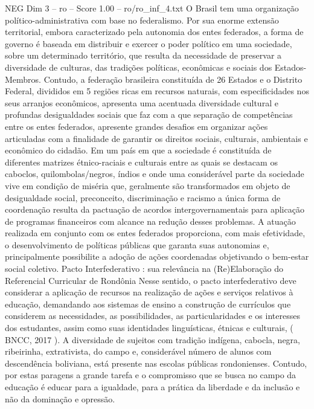 \begin{textsample}{NEG Dim 3 – ro – Score 1.00 – ro/ro\_inf\_4.txt}  \label{ex:f3_neg_152}
O Brasil tem uma organização político-administrativa com base no federalismo.
Por sua enorme extensão territorial, embora caracterizado pela autonomia dos entes federados, a forma de governo é baseada em distribuir e exercer o poder político em uma sociedade, sobre um determinado território, que resulta da necessidade de preservar a diversidade de culturas, das tradições políticas, econômicas e sociais dos Estados-Membros.
Contudo, a federação brasileira constituída de 26 Estados e o Distrito Federal, divididos em 5 regiões ricas em recursos naturais, com especificidades nos seus arranjos econômicos, apresenta uma acentuada diversidade cultural e profundas desigualdades sociais que faz com a que separação de competências entre os entes federados, apresente grandes desafios em organizar ações articuladas com a finalidade de garantir os direitos sociais, culturais, ambientais e econômico do cidadão.
Em um país em que a sociedade é constituída de diferentes matrizes étnico-raciais e culturais entre as quais se destacam os caboclos, quilombolas/negros, índios e onde uma considerável parte da sociedade vive em condição de miséria que, geralmente são transformados em objeto de desigualdade social, preconceito, discriminação e racismo a única forma de coordenação resulta da pactuação de acordos intergovernamentais para aplicação de programas financeiros com alcance na redução desses problemas.
A atuação realizada em conjunto com os entes federados proporciona, com mais efetividade, o desenvolvimento de políticas públicas que garanta suas autonomias e, principalmente possibilite a adoção de ações coordenadas objetivando o bem-estar social coletivo.
Pacto Interfederativo : sua relevância na (Re)Elaboração do Referencial Curricular de Rondônia Nesse sentido, o pacto interfederativo deve considerar a aplicação de recursos na realização de ações e serviços relativos à educação, demandando aos sistemas de ensino a construção de currículos que considerem as necessidades, as possibilidades, as particularidades e os interesses dos estudantes, assim como suas identidades linguísticas, étnicas e culturais, ( BNCC, 2017 ).
A diversidade de sujeitos com tradição indígena, cabocla, negra, ribeirinha, extrativista, do campo e, considerável número de alunos com descendência boliviana, está presente nas escolas públicas rondonienses.
Contudo, por estas paragens a grande tarefa e o compromisso que se busca no campo da educação é educar para a igualdade, para a prática da liberdade e da inclusão e não da dominação e opressão.

\end{textsample}
